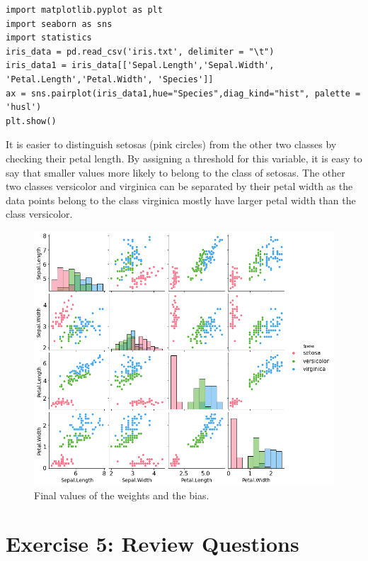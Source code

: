 \documentclass[onecolumn]{article}
\begin{document}
\begin{lstlisting}
import matplotlib.pyplot as plt 
import seaborn as sns 
import statistics 
iris_data = pd.read_csv('iris.txt', delimiter = "\t")
iris_data1 = iris_data[['Sepal.Length','Sepal.Width',
'Petal.Length','Petal.Width', 'Species']]
ax = sns.pairplot(iris_data1,hue="Species",diag_kind="hist", palette = 'husl')
plt.show()
\end{lstlisting}
It is easier to distinguish setosas (pink circles) from the other two classes by checking their petal length. By assigning a threshold for this variable, it is easy to say that smaller values more likely to belong to the class of setosas. \newline
The other two classes versicolor and virginica can be separated by their petal width as the data points belong to the class virginica mostly have larger petal width than the class versicolor.
\begin{figure}[H]
	\centering
	\includegraphics[width=.8\linewidth]{fig/s01_ex4_output.png}
	\caption{\label{fig:s01_ex4_output}
		Final values of the weights and the bias.}
\end{figure}


\section{Exercise 5: Review Questions}
\end{document}
